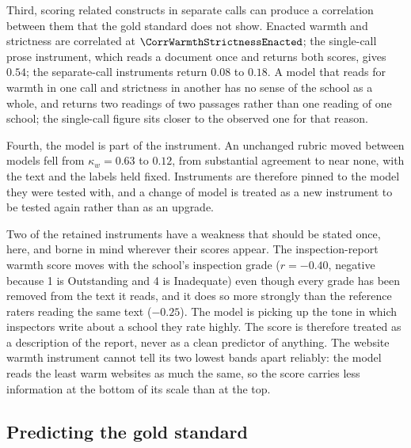 Third, scoring related constructs in separate calls can produce a
correlation between them that the gold standard does not show. Enacted
warmth and strictness are correlated at $\CorrWarmthStrictnessEnacted$; the
single-call prose instrument, which reads a document once and returns both
scores, gives $0.54$; the separate-call instruments return $0.08$ to $0.18$.
A model that reads for warmth in one call and strictness in another has no
sense of the school as a whole, and returns two readings of two passages
rather than one reading of one school; the single-call figure sits closer to
the observed one for that reason.

Fourth, the model is part of the instrument. An unchanged rubric moved
between models fell from $\kappa_w = 0.63$ to $0.12$, from substantial
agreement to near none, with the text and the labels held fixed. Instruments
are therefore pinned to the model they were tested with, and a change of
model is treated as a new instrument to be tested again rather than as an
upgrade.

Two of the retained instruments have a weakness that should be stated once,
here, and borne in mind wherever their scores appear. The inspection-report
warmth score moves with the school's inspection grade ($r = -0.40$, negative
because 1 is Outstanding and 4 is Inadequate) even though every grade has
been removed from the text it reads, and it does so more strongly than the
reference raters reading the same text ($-0.25$). The model is picking up the
tone in which inspectors write about a school they rate highly. The score is
therefore treated as a description of the report, never as a clean predictor
of anything. The website warmth instrument cannot tell its two lowest bands
apart reliably: the model reads the least warm websites as much the same,
so the score carries less information at the bottom of its scale than at
the top.

\subsection{Predicting the gold standard}

